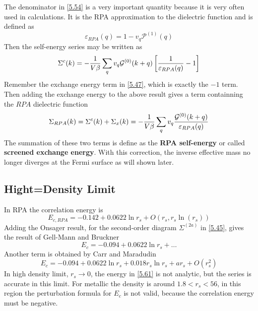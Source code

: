 The denominator in \eqref{5.54} is a very important quantity because it is very often used in calculations.
It is the RPA approximation to the dielectric function and is defined as
\begin{equation}
    \varepsilon_{RPA} (q) = 1 - v_q \mathcal{P}^{(1)}(q)    \label{5.55}
\end{equation}
Then the self-energy series may be written as
\begin{equation}
    \Sigma^c(k) = - \frac{1}{V\beta}  \sum_q v_q \mathcal{G}^{(0)}(k+q) \left[ \frac{1}{\varepsilon_{RPA}(q)}-1  \right]    \label{5.56}
\end{equation}
Remember the exchange energy term in \eqref{5.47}, which is exactly the $-1$ term.
Then adding the exchange energy to the above result gives a term containning the $RPA$ dielectric function
\begin{equation}
    \Sigma_{RPA}(k) = \Sigma^c(k) + \Sigma_x(k) = - \frac{1}{V\beta}  \sum_q v_q \frac{\mathcal{G}^{(0)}(k+q)}{\varepsilon_{RPA}(q)} \label{5.58}
\end{equation}
The summation of these two terms is define as the \textbf{RPA self-energy} or called \textbf{screened exchange energy}.
With this correction, the inverse effective mass no longer diverges at the Fermi surface as will shown later.

\subsection{Hight=Density Limit}
In RPA the correlation energy is
\begin{equation}
    E_{c,RPA} = -0.142 + 0.0622 \ln r_s + O(r_s, r_s \ln(r_s))  \label{5.59}
\end{equation}
Adding the Onsager result, for the second-order diagram $\Sigma^{(2a)}$ in \eqref{5.45}, gives the result of Gell-Mann and Bruckner
\begin{equation}
    E_c = -0.094 + 0.0622 \ln r_s + \dots   \label{5.60}
\end{equation}
Another term is obtained by Carr and Maradudin
\begin{equation}
    E_c = -0.094 + 0.0622 \ln r_s + 0.018 r_s \ln r_s + a r_s + O(r_s^2)   \label{5.61}
\end{equation}
In high density limit, $r_s \to 0 $, the energy in \eqref{5.61} is not analytic, but the series is accurate in this limit.
For metallic the density is around $1.8<r_s<56$, in this region  the perturbation formula for $E_c$ is not valid, because the correlation energy must be negative.

